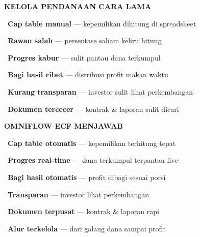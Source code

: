 \documentclass[a4paper]{article}
\begin{document}
\noindent
\begin{minipage}[t]{0.485\textwidth}
    \colorbox{RedLight}{%
        \begin{minipage}{\dimexpr\textwidth-2\fboxsep\relax}
            {\fontsize{10}{13}\selectfont\bfseries\color{RedText} KELOLA PENDANAAN CARA LAMA}
        \end{minipage}}\par
    \vspace{4pt}

    {\fontsize{9.5}{13}\selectfont\color{TextDark}%
    \textbullet\ \textbf{Cap table manual} --- kepemilikan dihitung di spreadsheet\par\vspace{4pt}%
    \textbullet\ \textbf{Rawan salah} --- persentase saham keliru hitung\par\vspace{4pt}%
    \textbullet\ \textbf{Progres kabur} --- sulit pantau dana terkumpul\par\vspace{4pt}%
    \textbullet\ \textbf{Bagi hasil ribet} --- distribusi profit makan waktu\par\vspace{4pt}%
    \textbullet\ \textbf{Kurang transparan} --- investor sulit lihat perkembangan\par\vspace{4pt}%
    \textbullet\ \textbf{Dokumen tercecer} --- kontrak \& laporan sulit dicari}%
\end{minipage}%
\hfill%
\begin{minipage}[t]{0.485\textwidth}
    \colorbox{BluePrimary}{%
        \begin{minipage}{\dimexpr\textwidth-2\fboxsep\relax}
            {\fontsize{10}{13}\selectfont\bfseries\color{White} OMNIFLOW ECF MENJAWAB}
        \end{minipage}}\par
    \vspace{4pt}

    {\fontsize{9.5}{13}\selectfont\color{TextDark}%
    \textbullet\ \textbf{Cap table otomatis} --- kepemilikan terhitung tepat\par\vspace{4pt}%
    \textbullet\ \textbf{Progres real-time} --- dana terkumpul terpantau live\par\vspace{4pt}%
    \textbullet\ \textbf{Bagi hasil otomatis} --- profit dibagi sesuai porsi\par\vspace{4pt}%
    \textbullet\ \textbf{Transparan} --- investor lihat perkembangan\par\vspace{4pt}%
    \textbullet\ \textbf{Dokumen terpusat} --- kontrak \& laporan rapi\par\vspace{4pt}%
    \textbullet\ \textbf{Alur terkelola} --- dari galang dana sampai profit}%
\end{minipage}
\end{document}
